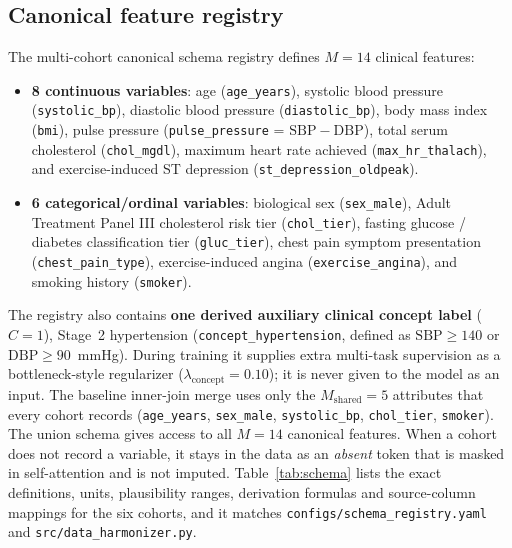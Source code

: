 \documentclass[conference]{IEEEtran}
\begin{document}
\subsection{Canonical feature registry}\label{sec:schema}
The multi-cohort canonical schema registry defines $M=14$ clinical features:
\begin{itemize}
\item \textbf{8 continuous variables}: age (\texttt{age\_years}), systolic blood pressure (\texttt{systolic\_bp}), diastolic blood pressure (\texttt{diastolic\_bp}), body mass index (\texttt{bmi}), pulse pressure (\texttt{pulse\_pressure} = $\mathrm{SBP}-\mathrm{DBP}$), total serum cholesterol (\texttt{chol\_mgdl}), maximum heart rate achieved (\texttt{max\_hr\_thalach}), and exercise-induced ST depression (\texttt{st\_depression\_oldpeak}).
\item \textbf{6 categorical/ordinal variables}: biological sex (\texttt{sex\_male}), Adult Treatment Panel III cholesterol risk tier (\texttt{chol\_tier}), fasting glucose / diabetes classification tier (\texttt{gluc\_tier}), chest pain symptom presentation (\texttt{chest\_pain\_type}), exercise-induced angina (\texttt{exercise\_angina}), and smoking history (\texttt{smoker}).
\end{itemize}
The registry also contains \textbf{one derived auxiliary clinical concept label} ($C=1$), Stage~2 hypertension (\texttt{concept\_hypertension}, defined as $\mathrm{SBP}\ge 140$ or $\mathrm{DBP}\ge 90$~mmHg). During training it supplies extra multi-task supervision as a bottleneck-style regularizer ($\lambda_{\mathrm{concept}}=0.10$); it is never given to the model as an input.
The baseline inner-join merge uses only the $M_{\mathrm{shared}}=5$ attributes that every cohort records (\texttt{age\_years}, \texttt{sex\_male}, \texttt{systolic\_bp}, \texttt{chol\_tier}, \texttt{smoker}). The union schema gives access to all $M=14$ canonical features. When a cohort does not record a variable, it stays in the data as an \emph{absent} token that is masked in self-attention and is not imputed. Table~\ref{tab:schema} lists the exact definitions, units, plausibility ranges, derivation formulas and source-column mappings for the six cohorts, and it matches \texttt{configs/schema\_registry.yaml} and \texttt{src/data\_harmonizer.py}.
\end{document}
